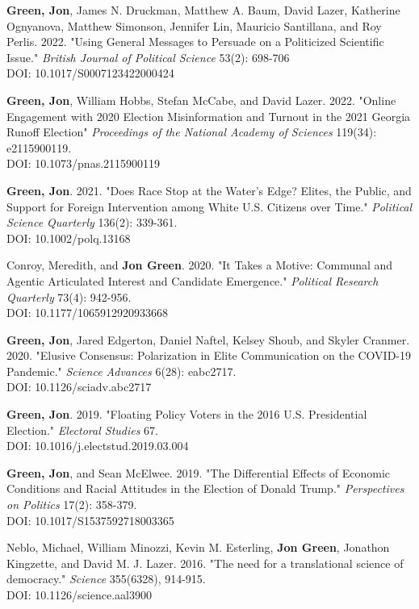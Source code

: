 \documentclass[letterpaper]{article}
\begin{document}
\begin{etaremune}
\item  \textbf{Green, Jon}, James N. Druckman, Matthew A. Baum, David Lazer, Katherine Ognyanova, Matthew Simonson, Jennifer Lin, Mauricio Santillana, and Roy Perlis. 2022. "Using General Messages to Persuade on a Politicized Scientific Issue." \textit{British Journal of Political Science} 53(2): 698-706 \\
DOI: 10.1017/S0007123422000424

\item  \textbf{Green, Jon}, William Hobbs, Stefan McCabe, and David Lazer. 2022. "Online Engagement with 2020 Election Misinformation and Turnout in the 2021 Georgia Runoff Election"  \textit{Proceedings of the National Academy of Sciences} 119(34): e2115900119. \\
DOI: 10.1073/pnas.2115900119

\item \textbf{Green, Jon}. 2021. "Does Race Stop at the Water's Edge? Elites, the Public, and Support for Foreign Intervention among White U.S. Citizens over Time." \textit{Political Science Quarterly} 136(2): 339-361. \\
DOI: 10.1002/polq.13168

\item Conroy, Meredith, and \textbf{Jon Green}. 2020. "It Takes a Motive: Communal and Agentic Articulated Interest and Candidate Emergence."  \textit{Political Research Quarterly} 73(4): 942-956. \\
DOI: 10.1177/1065912920933668

\item \textbf{Green, Jon}, Jared Edgerton, Daniel Naftel, Kelsey Shoub, and Skyler Cranmer. 2020. "Elusive Consensus: Polarization in Elite Communication on the COVID-19 Pandemic." \textit{Science Advances} 6(28): eabc2717. \\
DOI: 10.1126/sciadv.abc2717

\item \textbf{Green, Jon}. 2019. "Floating Policy Voters in the 2016 U.S. Presidential Election." \textit{Electoral Studies} 67. \\
DOI: 10.1016/j.electstud.2019.03.004

\item \textbf{Green, Jon}, and Sean McElwee. 2019. "The Differential Effects of Economic Conditions and Racial Attitudes in the Election of Donald Trump." \textit{Perspectives on Politics} 17(2): 358-379. \\
DOI: 10.1017/S1537592718003365

\item Neblo, Michael, William Minozzi, Kevin M. Esterling, \textbf{Jon Green}, Jonathon Kingzette, and David M. J. Lazer. 2016. "The need for a translational science of democracy." \textit{Science} 355(6328), 914-915.\\
DOI: 10.1126/science.aal3900

\end{etaremune}
\end{document}
